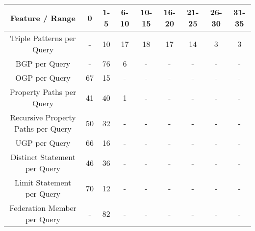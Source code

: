 \begin{center}
    \begin{tabular}{|*{9}{c|}}
     \hline
     Feature / Range & 0 & 1-5 & 6-10 & 10-15 & 16-20 & 21-25 & 26-30 & 31-35 \\ 
     \hline \hline
     Triple Patterns per Query & - & 10 & 17 & 18 & 17 & 14 & 3 & 3 \\ 
     \hline
     BGP per Query & - & 76 & 6 & - & - & - & - & - \\ 
     \hline
     OGP per Query & 67 & 15 & - & - & - & - & - & - \\ 
     \hline
     Property Paths per Query & 41 & 40 & 1 & - & - & - & - & - \\ 
     \hline
     Recursive Property Paths per Query & 50 & 32 & - & - & - & - & - & - \\ 
     \hline
     UGP per Query & 66 & 16 & - & - & - & - & - & - \\ 
     \hline
     Distinct Statement per Query & 46 & 36 & - & - & - & - & - & - \\ 
     \hline
     Limit Statement per Query & 70 & 12 & - & - & - & - & - & - \\  
     \hline
     Federation Member per Query & - & 82 & - & - & - & - & - & - \\  
     \hline
    \end{tabular}
\end{center}